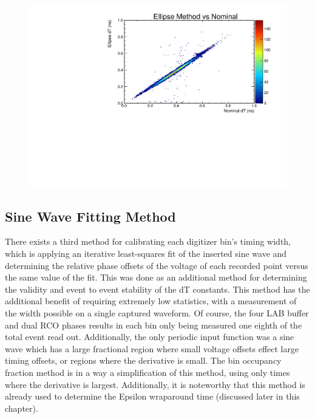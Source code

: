 	\begin{figure}
		\includegraphics[width=\textwidth]{figures/ellipseComparison}
		\caption{}
		\label{fig:ellipseResults}
	\end{figure}


	\subsection{Sine Wave Fitting Method}
	
	There exists a third method for calibrating each digitizer bin's timing width, which is applying an iterative least-squares fit of the inserted sine wave and determining the relative phase offsets of the voltage of each recorded point versus the same value of the fit.  This was done as an additional method for determining the validity and event to event stability of the dT constants.  This method has the additional benefit of requiring extremely low statistics, with a measurement of the width possible on a single captured waveform.  Of course, the four LAB buffer and dual RCO phases results in each bin only being measured one eighth of the total event read out.  Additionally, the only periodic input function was a sine wave which has a large fractional region where small voltage offsets effect large timing offsets, or regions where the derivative is small.  The bin occupancy fraction method is in a way a simplification of this method, using only times where the derivative is largest.  Additionally, it is noteworthy that this method is already used to determine the Epsilon wraparound time (discussed later in this chapter).
	
	
	
